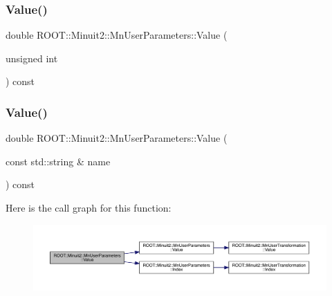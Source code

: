 \subsubsection{\texorpdfstring{Value()}{Value()}\hspace{0.1cm}{\footnotesize\ttfamily [2/4]}}
{\footnotesize\ttfamily double R\+O\+O\+T\+::\+Minuit2\+::\+Mn\+User\+Parameters\+::\+Value (\begin{DoxyParamCaption}\item[{unsigned int}]{ }\end{DoxyParamCaption}) const}

\mbox{\label{classROOT_1_1Minuit2_1_1MnUserParameters_a4d08de604380552a826ac23ca4978767}} 
\subsubsection{\texorpdfstring{Value()}{Value()}\hspace{0.1cm}{\footnotesize\ttfamily [3/4]}}
{\footnotesize\ttfamily double R\+O\+O\+T\+::\+Minuit2\+::\+Mn\+User\+Parameters\+::\+Value (\begin{DoxyParamCaption}\item[{const std\+::string \&}]{name }\end{DoxyParamCaption}) const}

Here is the call graph for this function\+:\nopagebreak
\begin{figure}[H]
\begin{center}
\leavevmode
\includegraphics[width=350pt]{d6/d10/classROOT_1_1Minuit2_1_1MnUserParameters_a4d08de604380552a826ac23ca4978767_cgraph}
\end{center}
\end{figure}
\mbox{\label{classROOT_1_1Minuit2_1_1MnUserParameters_a4d08de604380552a826ac23ca4978767}} 
